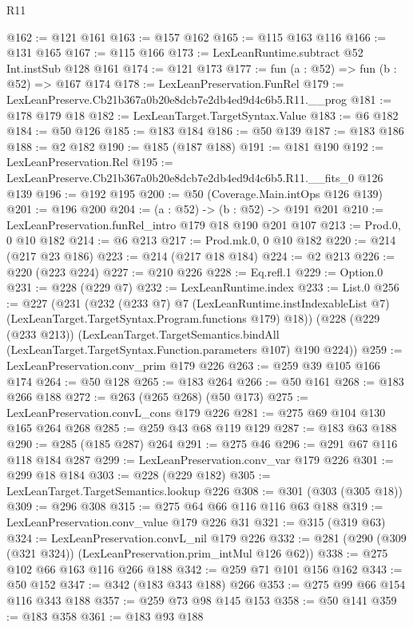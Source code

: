 \begin{lexlean}{R11}
\begin{coremodule}
@162 := @121 @161
@163 := @157 @162
@165 := @115 @163 @116
@166 := @131 @165
@167 := @115 @166
@173 := LexLeanRuntime.subtract @52 Int.instSub @128 @161
@174 := @121 @173
@177 := fun (a : @52) => fun (b : @52) => @167 @174
@178 := LexLeanPreservation.FunRel
@179 := LexLeanPreserve.Cb21b367a0b20e8dcb7e2db4ed9d4c6b5.R11.__prog
@181 := @178 @179 @18
@182 := LexLeanTarget.TargetSyntax.Value
@183 := @6 @182
@184 := @50 @126
@185 := @183 @184
@186 := @50 @139
@187 := @183 @186
@188 := @2 @182
@190 := @185 (@187 @188)
@191 := @181 @190
@192 := LexLeanPreservation.Rel
@195 := LexLeanPreserve.Cb21b367a0b20e8dcb7e2db4ed9d4c6b5.R11.__fits_0 @126 @139
@196 := @192 @195
@200 := @50 (Coverage.Main.intOps @126 @139)
@201 := @196 @200
@204 := (a : @52) -> (b : @52) -> @191 @201
@210 := LexLeanPreservation.funRel_intro @179 @18 @190 @201 @107
@213 := Prod.{0, 0} @10 @182
@214 := @6 @213
@217 := Prod.mk.{0, 0} @10 @182
@220 := @214 (@217 @23 @186)
@223 := @214 (@217 @18 @184)
@224 := @2 @213
@226 := @220 (@223 @224)
@227 := @210 @226
@228 := Eq.refl.{1}
@229 := Option.{0}
@231 := @228 (@229 @7)
@232 := LexLeanRuntime.index
@233 := List.{0}
@256 := @227
    (@231
      (@232
        (@233 @7)
        @7
        (LexLeanRuntime.instIndexableList @7)
        (LexLeanTarget.TargetSyntax.Program.functions @179)
        @18))
    (@228
      (@229 (@233 @213))
      (LexLeanTarget.TargetSemantics.bindAll
        (LexLeanTarget.TargetSyntax.Function.parameters @107)
        @190
        @224))
@259 := LexLeanPreservation.conv_prim @179 @226
@263 := @259 @39 @105 @166 @174
@264 := @50 @128
@265 := @183 @264
@266 := @50 @161
@268 := @183 @266 @188
@272 := @263 (@265 @268) (@50 @173)
@275 := LexLeanPreservation.convL_cons @179 @226
@281 := @275 @69 @104 @130 @165 @264 @268
@285 := @259 @43 @68 @119 @129
@287 := @183 @63 @188
@290 := @285 (@185 @287) @264
@291 := @275 @46
@296 := @291 @67 @116 @118 @184 @287
@299 := LexLeanPreservation.conv_var @179 @226
@301 := @299 @18 @184
@303 := @228 (@229 @182)
@305 := LexLeanTarget.TargetSemantics.lookup @226
@308 := @301 (@303 (@305 @18))
@309 := @296 @308
@315 := @275 @64 @66 @116 @116 @63 @188
@319 := LexLeanPreservation.conv_value @179 @226 @31
@321 := @315 (@319 @63)
@324 := LexLeanPreservation.convL_nil @179 @226
@332 := @281 (@290 (@309 (@321 @324)) (LexLeanPreservation.prim_intMul @126 @62))
@338 := @275 @102 @66 @163 @116 @266 @188
@342 := @259 @71 @101 @156 @162
@343 := @50 @152
@347 := @342 (@183 @343 @188) @266
@353 := @275 @99 @66 @154 @116 @343 @188
@357 := @259 @73 @98 @145 @153
@358 := @50 @141
@359 := @183 @358
@361 := @183 @93 @188

\end{coremodule}
\end{lexlean}
